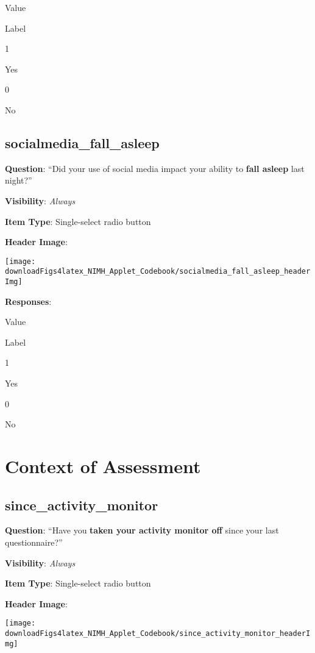 \documentclass[]{book}
\begin{document}
Value

Label

1

Yes

0

No

\hypertarget{socialmedia_fall_asleep}{%
\section{socialmedia\_fall\_asleep}\label{socialmedia_fall_asleep}}

\textbf{Question}: ``Did your use of social media impact your ability to \textbf{fall asleep} last night?''

\textbf{Visibility}: \emph{Always}

\textbf{Item Type}: Single-select radio button

\textbf{Header Image}:

\begin{flushleft}\texttt{[image: downloadFigs4latex\_NIMH\_Applet\_Codebook/socialmedia\_fall\_asleep\_headerImg]} \end{flushleft}

\textbf{Responses}:

Value

Label

1

Yes

0

No

\hypertarget{context_section}{%
\chapter{Context of Assessment}\label{context_section}}

\hypertarget{since_activity_monitor}{%
\section{since\_activity\_monitor}\label{since_activity_monitor}}

\textbf{Question}: ``Have you \textbf{taken your activity monitor off} since your last questionnaire?''

\textbf{Visibility}: \emph{Always}

\textbf{Item Type}: Single-select radio button

\textbf{Header Image}:

\begin{flushleft}\texttt{[image: downloadFigs4latex\_NIMH\_Applet\_Codebook/since\_activity\_monitor\_headerImg]} \end{flushleft}
\end{document}

